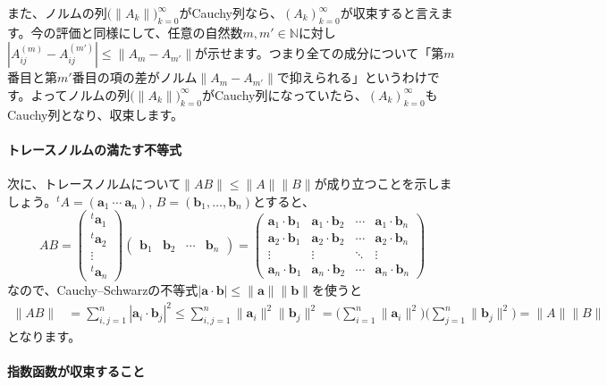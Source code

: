 また、ノルムの列$\bigl(\|A_k\|\bigr)_{k = 0}^{\infty}$がCauchy列なら、$(A_k)_{k = 0}^{\infty}$が収束すると言えます。今の評価と同様にして、任意の自然数$m, m'\in\mathbb{N}$に対し$|A^{(m)}_{ij} - A^{(m')}_{ij}| \leq \|A_m - A_{m'}\|$が示せます。つまり全ての成分について「第$m$番目と第$m'$番目の項の差がノルム$\|A_m - A_{m'}\|$で抑えられる」というわけです。よってノルムの列$\bigl(\|A_k\|\bigr)_{k = 0}^{\infty}$がCauchy列になっていたら、$(A_k)_{k = 0}^{\infty}$もCauchy列となり、収束します。


\paragraph{トレースノルムの満たす不等式}

次に、トレースノルムについて$\|AB\| \leq \|A\| \|B\|$が成り立つことを示しましょう。${}^t\!A = (\bm{a}_1 \ \cdots \ \bm{a}_n)$, $B = (\bm{b}_1, \ldots, \bm{b}_n)$とすると、
\[
AB =
\begin{pmatrix}
{}^t\bm{a}_1 \\
{}^t\bm{a}_2 \\
\vdots \\
{}^t\bm{a}_n
\end{pmatrix}
\begin{pmatrix}
\bm{b}_1 & \bm{b}_2 & \cdots & \bm{b}_n
\end{pmatrix}
=
\begin{pmatrix}
\bm{a}_1 \cdot \bm{b}_1 & \bm{a}_1 \cdot \bm{b}_2 & \cdots & \bm{a}_1 \cdot \bm{b}_n \\
\bm{a}_2 \cdot \bm{b}_1 & \bm{a}_2 \cdot \bm{b}_2 & \cdots & \bm{a}_2 \cdot \bm{b}_n \\
\vdots & \vdots & \ddots & \vdots \\
\bm{a}_n \cdot \bm{b}_1 &  \bm{a}_n \cdot \bm{b}_2 & \cdots & \bm{a}_n \cdot \bm{b}_n
\end{pmatrix}
\]
なので、Cauchy--Schwarzの不等式$|\bm{a}\cdot\bm{b}| \leq \|\bm{a}\| \|\bm{b}\| $を使うと
\begin{align*}
\|AB\|
&= \sum_{i, j = 1}^n |\bm{a}_i \cdot \bm{b}_j|^2
\leq \sum_{i, j = 1}^n \|\bm{a}_i\|^2 \|\bm{b}_j\|^2
= \Biggl(\sum_{i = 1}^n \|\bm{a}_i\|^2 \Biggr) \Biggl( \sum_{j = 1}^n \|\bm{b}_j\|^2 \Biggr)
= \|A\| \|B\|
\end{align*}
となります。

\paragraph{指数函数が収束すること}

